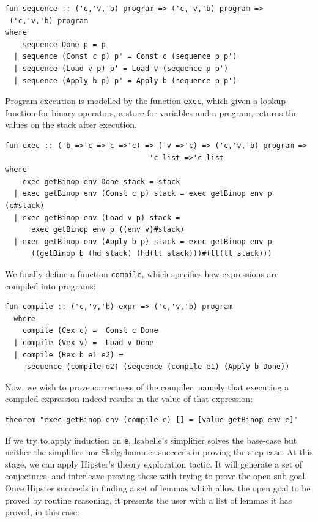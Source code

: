 \begin{small}
\begin{verbatim}
fun sequence :: ('c,'v,'b) program => ('c,'v,'b) program =>
 ('c,'v,'b) program
where
    sequence Done p = p
  | sequence (Const c p) p' = Const c (sequence p p')
  | sequence (Load v p) p' = Load v (sequence p p')
  | sequence (Apply b p) p' = Apply b (sequence p p')
\end{verbatim}
\end{small}
Program execution is modelled by the function \texttt{exec}, which given a lookup function for binary operators, a store for variables and a program, returns the values on the stack after execution.
\begin{small}
\begin{verbatim}
fun exec :: ('b =>'c =>'c =>'c) => ('v =>'c) => ('c,'v,'b) program =>
								 'c list =>'c list
where
    exec getBinop env Done stack = stack
  | exec getBinop env (Const c p) stack = exec getBinop env p (c#stack) 
  | exec getBinop env (Load v p) stack = 
  	  exec getBinop env p ((env v)#stack)
  | exec getBinop env (Apply b p) stack = exec getBinop env p 
  	  ((getBinop b (hd stack) (hd(tl stack)))#(tl(tl stack)))
\end{verbatim}
\end{small}
We finally define a function \texttt{compile}, which specifies how expressions are compiled into programs:
\begin{small}
\begin{verbatim}
fun compile :: ('c,'v,'b) expr => ('c,'v,'b) program
  where
    compile (Cex c) =  Const c Done
  | compile (Vex v) =  Load v Done
  | compile (Bex b e1 e2) = 
     sequence (compile e2) (sequence (compile e1) (Apply b Done))
\end{verbatim}
\end{small}
Now, we wish to prove correctness of the compiler, namely that executing a compiled expression indeed results in the value of that expression: 
\begin{verbatim}
theorem "exec getBinop env (compile e) [] = [value getBinop env e]"
\end{verbatim}
If we try to apply induction on \texttt{e}, Isabelle's simplifier solves the base-case but neither the simplifier nor Sledgehammer succeeds in proving the step-case. At this stage, we can apply Hipster's theory exploration tactic. It will generate a set of conjectures, and interleave proving these with trying to prove the open sub-goal. Once Hipster succeeds in finding a set of lemmas which allow the open goal to be proved by routine reasoning, it presents the user with a list of lemmas it has proved, in this case:
